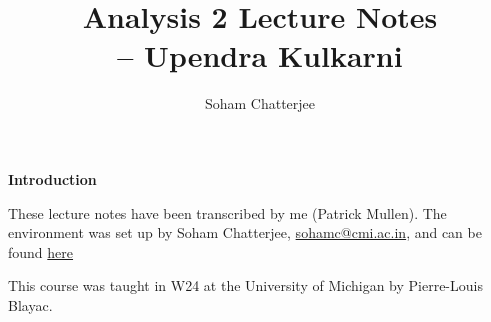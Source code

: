 \documentclass{report}
\title{\Huge{Analysis 2 Lecture Notes}\\ \hspace{4cm}-- Upendra Kulkarni}
\author{\huge{Soham Chatterjee}}
\date{}
\begin{document}
\thispagestyle{empty}
\newpage%
\vspace*{5cm}

\begin{center}
	\textbf{Introduction}
\end{center}

These lecture notes have been transcribed by me (Patrick Mullen). The environment was set up by Soham Chatterjee, \url{sohamc@cmi.ac.in}, and can be found \href{https://github.com/lambdasolver/LaTeX/tree/master/CMI/B.Sc/Sem%202}{here}

This course was taught in W24 at the University of Michigan by Pierre-Louis Blayac.
\pagebreak

\tableofcontents
\pagebreak










\end{document}
